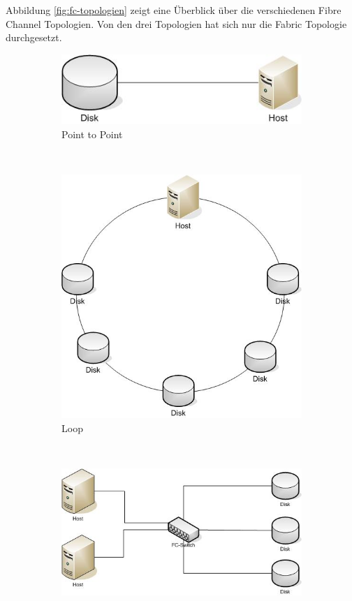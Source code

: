 Abbildung \ref{fig:fc-topologien} zeigt eine Überblick über die verschiedenen Fibre Channel Topologien. Von den drei Topologien hat sich nur die Fabric Topologie durchgesetzt. 

\begin{figure}[h!]
	\centering
	\begin{subfigure}[b]{0.3\textwidth}
		\includegraphics[width=\textwidth]{fig/fc-point-to-point}
		\caption{Point to Point}
	\end{subfigure}
	~
	\begin{subfigure}[b]{0.3\textwidth}
		\includegraphics[width=\textwidth]{fig/fc-loop}
		\caption{Loop}
	\end{subfigure}
	~
	\begin{subfigure}[b]{0.3\textwidth}
		\includegraphics[width=\textwidth]{fig/fc-fabric}

\end{subfigure}
\end{figure}
